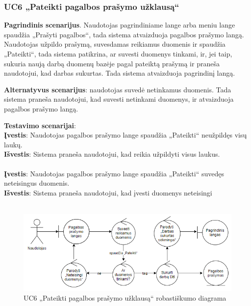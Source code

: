 \documentclass{VUMIFPSbakalaurinis}
\begin{document}
\subsubsection{UC6 „Pateikti pagalbos prašymo užklausą“}
\textbf{Pagrindinis scenarijus}. Naudotojas pagrindiniame lange arba meniu lange spaudžia „Prašyti pagalbos“, tada sistema atvaizduoja pagalbos prašymo langą. Naudotojas užpildo prašymą, suvesdamas reikiamus duomenis ir spaudžia „Pateikti“, tada sistema patikrina, ar suvesti duomenys tinkami, ir, jei taip, sukuria naują darbą duomenų bazėje pagal pateiktą prašymą ir praneša naudotojui, kad darbas sukurtas. Tada sistema atvaizduoja pagrindinį langą.
\par \textbf{Alternatyvus scenarijus}: naudotojas suvedė netinkamus duomenis. Tada sistema praneša naudotojui, kad suvesti netinkami duomenys, ir atvaizduoja pagalbos prašymo langą.
\par \textbf{Testavimo scenarijai}:\\
\textbf{Įvestis}: Naudotojas pagalbos prašymo lange spaudžia „Pateikti“ neužpildęs visų laukų. \\
\textbf{Išvestis}: Sistema praneša naudotojui, kad reikia užpildyti visus laukus. \\ \\
\textbf{Įvestis}: Naudotojas pagalbos prašymo lange spaudžia „Pateikti“ suvedęs neteisingus duomenis. \\
\textbf{Išvestis}: Sistema praneša naudotojui, kad įvesti duomenys neteisingi\\ \\

\begin{figure}[H]
	\centering
	\includegraphics[scale=0.6]{img/Robustness/UC6}
	\caption{UC6 „Pateikti pagalbos prašymo užklausą“ robastiškumo diagrama}
	\label{img:uc6rob}
\end{figure}
\end{document}
